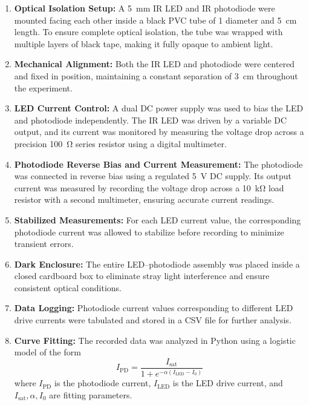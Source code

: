 \documentclass[12pt]{article}
\begin{document}
 \begin{enumerate}
  \item \textbf{Optical Isolation Setup:} A \SI{5}{\milli\meter} IR LED and  IR photodiode were mounted facing each other inside a black PVC tube of \SI{1}{\inch} diameter and \SI{5}{\centi\meter} length. To ensure complete optical isolation, the tube was wrapped with multiple layers of black tape, making it fully opaque to ambient light.

  \item \textbf{Mechanical Alignment:} Both the IR LED and photodiode were centered and fixed in position, maintaining a constant separation of \SI{3}{\centi\meter} throughout the experiment.

  \item \textbf{LED Current Control:} A dual DC power supply was used to bias the LED and photodiode independently. The IR LED was driven by a variable DC output, and its current was monitored by measuring the voltage drop across a precision \SI{100}{\ohm} series resistor using a digital multimeter.

  \item \textbf{Photodiode Reverse Bias and Current Measurement:} The photodiode was connected in reverse bias using a regulated \SI{5}{\volt} DC supply. Its output current was measured by recording the voltage drop across a \SI{10}{\kilo\ohm} load resistor with a second multimeter, ensuring accurate current readings.

  \item \textbf{Stabilized Measurements:} For each LED current value, the corresponding photodiode current was allowed to stabilize before recording to minimize transient errors.

  \item \textbf{Dark Enclosure:} The entire LED–photodiode assembly was placed inside a closed cardboard box to eliminate stray light interference and ensure consistent optical conditions.

  \item \textbf{Data Logging:} Photodiode current values corresponding to different LED drive currents were tabulated and stored in a CSV file for further analysis.

  \item \textbf{Curve Fitting:} The recorded data was analyzed in Python using a logistic model of the form
  \[
  I_{\text{PD}} = \frac{I_{\text{sat}}}{1 + e^{-\alpha (I_{\text{LED}} - I_0)}}
  \]
  where \( I_{\text{PD}} \) is the photodiode current, \( I_{\text{LED}} \) is the LED drive current, and \( I_{\text{sat}}, \alpha, I_0 \) are fitting parameters.
\end{enumerate}
\end{document}

